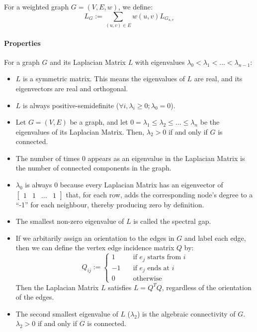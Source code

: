 For a weighted graph $G = (V,E,w)$, we define:
\begin{displaymath}
L_{G} := \sum_{(u,v) \in E} w(u,v)L_{G_{u,v}}
\end{displaymath}

\paragraph{Properties}
For a graph $G$ and its Laplacian Matrix $L$ with eigenvalues $\lambda_{0} < 
\lambda_{1} < \ldots < \lambda_{n-1}$:

\begin{itemize}
\item $L$ is a symmetric matrix. This means the eigenvalues of $L$ are real, and
its eigenvectors are real and orthogonal.
\item $L$ is always positive-semidefinite ($\forall i, \lambda_{i} \geq 0; 
\lambda_{0} = 0$).
\item Let $G = (V,E)$ be a graph, and let $0 = \lambda_{1} \leq \lambda_{2}
\leq \ldots \leq \lambda_{n}$ be the eigenvalues of its Laplacian Matrix. Then, 
$\lambda_{2} > 0$ if and only if $G$ is connected.
\item The number of times $0$ appears as an eigenvalue in the Laplacian Matrix 
is the number of connected components in the graph.
\item $\lambda_{0}$ is always $0$ because every Laplacian Matrix has an 
eigenvector of $\begin{bmatrix} 1 & 1 & \ldots & 1 \end{bmatrix}$ that, for each
row, adds the corresponding node's degree to a ``-1'' for each neighbour, 
thereby producing zero by definition.
\item The smallest non-zero eigenvalue of $L$ is called the spectral gap.
\item If we arbitarily assign an orientation to the edges in $G$ and label each
edge, then we can define the vertex edge incidence matrix $Q$ by:
\begin{displaymath}
Q_{ij} := 
    \left\{
        \begin{array}{ll}
            1 &     \quad \text{if $e_{j}$ starts from $i$} \\
            -1 &    \quad \text{if $e_{j}$ ends at $i$} \\
            0 &     \quad \text{otherwise}
        \end{array}
    \right.
\end{displaymath}
Then the Laplacian Matrix $L$ satisfies $L = Q^{T}Q$, regardless of the 
orientation of the edges.
\item The second smallest eigenvalue of $L$ ($\lambda_{2}$) is the algebraic 
connectivity of $G$. $\lambda_{2} > 0$ if and only if $G$ is connected.
\end{itemize}

